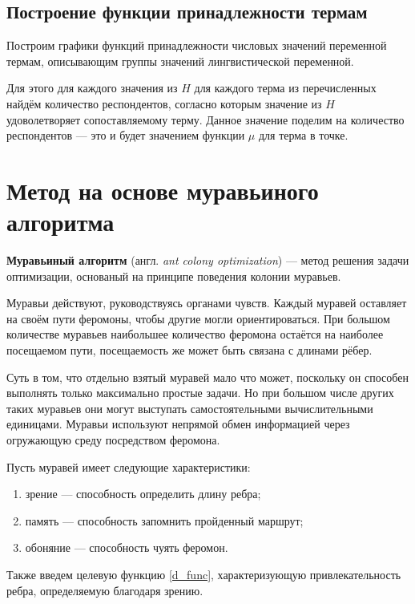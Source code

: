 \subsection{Построение функции принадлежности термам}

Построим графики функций принадлежности числовых значений переменной термам, описывающим группы значений лингвистической переменной.

Для этого для каждого значения из $H$ для каждого терма из перечисленных найдём количество респондентов, согласно которым значение из $H$ удоволетворяет сопоставляемому терму.
Данное значение поделим на количество респондентов --- это и будет значением функции $\mu$ для терма в точке.





\section{Метод на основе муравьиного алгоритма}

\textbf{Муравьиный алгоритм} (англ. \textit{ant colony optimization})  \cite{full-comb} --- метод решения задачи оптимизации, основаный на принципе поведения колонии муравьев.

Муравьи действуют, руководствуясь органами чувств. 
Каждый муравей оставляет на своём пути феромоны, чтобы другие могли ориентироваться. 
При большом количестве муравьев наибольшее количество феромона остаётся на наиболее посещаемом пути, посещаемость же может быть связана с длинами рёбер.

Суть в том, что отдельно взятый муравей мало что может, поскольку он способен выполнять только максимально простые задачи. Но при большом числе других таких муравьев они могут выступать самостоятельными вычислительными единицами. Муравьи используют непрямой обмен информацией через огружающую среду посредством феромона.

Пусть муравей имеет следующие характеристики:
\begin{enumerate}[label=\arabic*)]
	\item зрение --- способность определить длину ребра;
	\item память --- способность запомнить пройденный маршрут;
	\item обоняние --- способность чуять феромон.
\end{enumerate}


Также введем целевую функцию \eqref{d_func}, характеризующую привлекательность ребра, определяемую благодаря зрению.

